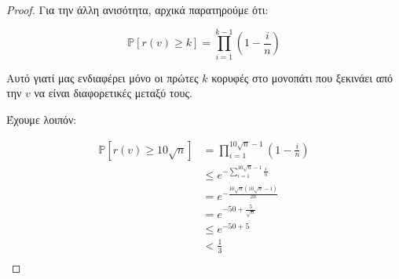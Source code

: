 \documentclass[a4paper, oneside, 11pt]{article}
\theoremstyle{definition}
\newcommand{\pr}{\mathbb{P}}
\begin{document}
\begin{enumerate}
\begin{proof}
Για την άλλη ανισότητα, αρχικά παρατηρούμε ότι:

\[ \pr[r(v) \geq k] = \prod_{i=1}^{k-1} \left( 1 - \frac{i}{n} \right) \]

Αυτό γιατί μας ενδιαφέρει μόνο οι πρώτες $k$ κορυφές στο μονοπάτι
που ξεκινάει από την $v$ να είναι διαφορετικές μεταξύ τους.

Έχουμε λοιπόν:

\begin{align*}
   \pr[r(v) \geq 10 \sqrt{n}]
      &= \prod_{i=1}^{10\sqrt{n} - 1} \left( 1 - \frac{i}{n} \right) \\
      &\leq e^{-\sum_{i=1}^{10\sqrt{n} - 1} \frac{i}{n}}\\
      &= e^{-\frac{10\sqrt{n}(10\sqrt{n}-1)}{2n}}\\
      &= e^{-50 + \frac{5}{\sqrt{n}}}\\
      &\leq e^{-50 + 5}\\
      &< \frac13\\
\end{align*}


\end{proof}
\end{enumerate}
\end{document}
